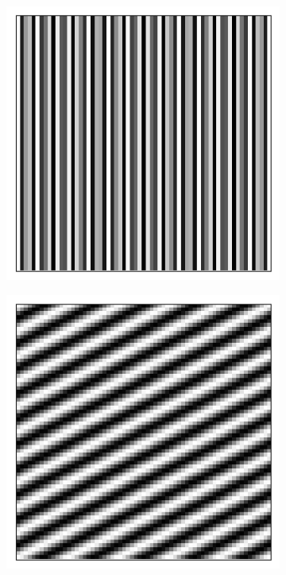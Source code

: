 \begin{figure}[h]
	\centering
	\begin{subfigure}[t]{0.3\textwidth}
		\centering
		\includegraphics[width=\linewidth]{images/fringes_1_kx_25_ky_0.png}
		\caption{}
		\label{fig:fringes_1_kx_40_ky_0}
	\end{subfigure}
	\begin{subfigure}[t]{0.3\textwidth}
		\centering
		\includegraphics[width=\linewidth]{images/fringes_2_kx_5_ky_10.png}

\end{subfigure}
\end{figure}

